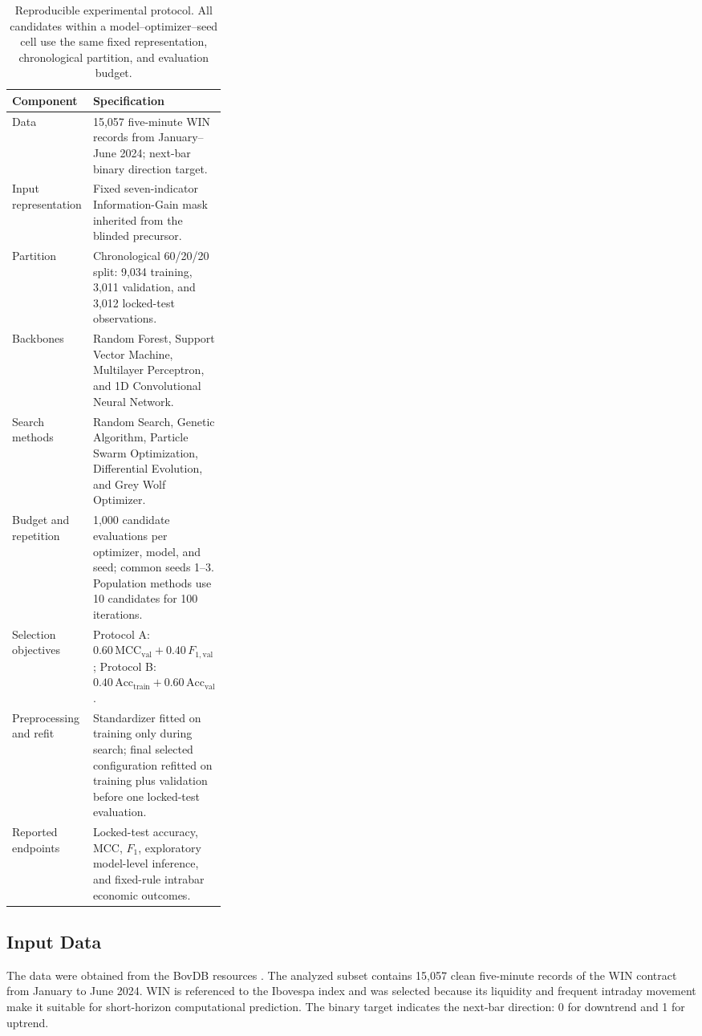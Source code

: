\begin{table}[htbp]
\centering
\caption{Reproducible experimental protocol. All candidates within a model--optimizer--seed cell use the same fixed representation, chronological partition, and evaluation budget.}
\label{tab:experimental_protocol}
\small
\begin{tabularx}{\linewidth}{@{}p{0.31\linewidth} L@{}}\toprule
\textbf{Component} & \textbf{Specification}\\\midrule
Data & 15,057 five-minute WIN records from January--June 2024; next-bar binary direction target.\\
Input representation & Fixed seven-indicator Information-Gain mask inherited from the blinded precursor.\\
Partition & Chronological 60/20/20 split: 9,034 training, 3,011 validation, and 3,012 locked-test observations.\\
Backbones & Random Forest, Support Vector Machine, Multilayer Perceptron, and 1D Convolutional Neural Network.\\
Search methods & Random Search, Genetic Algorithm, Particle Swarm Optimization, Differential Evolution, and Grey Wolf Optimizer.\\
Budget and repetition & 1,000 candidate evaluations per optimizer, model, and seed; common seeds 1--3. Population methods use 10 candidates for 100 iterations.\\
Selection objectives & Protocol A: $0.60\,\mathrm{MCC}_{\mathrm{val}}+0.40\,F_{1,\mathrm{val}}$; Protocol B: $0.40\,\mathrm{Acc}_{\mathrm{train}}+0.60\,\mathrm{Acc}_{\mathrm{val}}$.\\
Preprocessing and refit & Standardizer fitted on training only during search; final selected configuration refitted on training plus validation before one locked-test evaluation.\\
Reported endpoints & Locked-test accuracy, MCC, $F_1$, exploratory model-level inference, and fixed-rule intrabar economic outcomes.\\\bottomrule
\end{tabularx}
\end{table}

\subsection{Input Data}
\label{sec:data}

The data were obtained from the BovDB resources \cite{cardoso2022bovdb}. The analyzed subset contains 15,057 clean five-minute records of the WIN contract from January to June 2024. WIN is referenced to the Ibovespa index and was selected because its liquidity and frequent intraday movement make it suitable for short-horizon computational prediction. The binary target indicates the next-bar direction: 0 for downtrend and 1 for uptrend.

